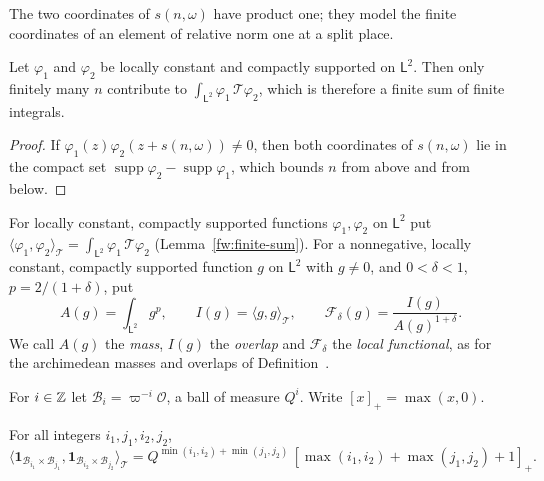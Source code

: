 The two coordinates of $s(n,\omega)$ have product one; they model the
finite coordinates of an element of relative norm one at a split place.

\begin{lemma}\label{fw:finite-sum}
Let $\varphi_1$ and $\varphi_2$ be locally constant and compactly supported
on $\mathsf L^2$. Then only finitely many $n$ contribute to
$\int_{\mathsf L^2}\varphi_1\,\mathcal T\varphi_2$, which is therefore a
finite sum of finite integrals.
\end{lemma}

\begin{proof}
If $\varphi_1(z)\varphi_2(z+s(n,\omega))\ne0$, then both coordinates of
$s(n,\omega)$ lie in the compact set
$\operatorname{supp}\varphi_2-\operatorname{supp}\varphi_1$, which bounds
$n$ from above and from below.
\end{proof}

\begin{definition}\label{fw:local-functional}
For locally constant, compactly supported functions $\varphi_1,\varphi_2$ on
$\mathsf L^2$ put $\langle\varphi_1,\varphi_2\rangle_{\mathcal
T}=\int_{\mathsf L^2}\varphi_1\,\mathcal T\varphi_2$
(Lemma~\ref{fw:finite-sum}). For a nonnegative, locally constant, compactly
supported function $g$ on $\mathsf L^2$ with $g\ne0$, and $0<\delta<1$,
$p=2/(1+\delta)$, put
\begin{equation}\label{fw:functional}
 A(g)=\int_{\mathsf L^2}g^p,\qquad I(g)=\langle g,g\rangle_{\mathcal T},\qquad
 \mathcal F_\delta(g)=\frac{I(g)}{A(g)^{1+\delta}} .
\end{equation}
We call $A(g)$ the \emph{mass}, $I(g)$ the \emph{overlap} and
$\mathcal F_\delta$ the \emph{local functional}, as for the archimedean
masses and overlaps of Definition~.
\end{definition}

For $i\in\mathbb Z$ let $\mathcal B_i=\varpi^{-i}\mathcal O$, a ball of measure
$Q^i$. Write $[x]_+=\max(x,0)$.

\begin{lemma}\label{fw:gram-lemma}
For all integers $i_1,j_1,i_2,j_2$,
\begin{equation}\label{fw:rectangle-gram}
 \bigl\langle\mathbf 1_{\mathcal B_{i_1}\times\mathcal B_{j_1}},
 \mathbf 1_{\mathcal B_{i_2}\times\mathcal B_{j_2}}\bigr\rangle_{\mathcal T}
 =Q^{\min(i_1,i_2)+\min(j_1,j_2)}\,
 [\max(i_1,i_2)+\max(j_1,j_2)+1]_+.
\end{equation}
\end{lemma}

